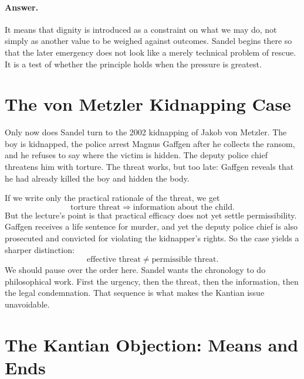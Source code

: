\paragraph{Answer.} It means that dignity is introduced as a constraint on what we may do, not simply as another value to be weighed against outcomes. Sandel begins there so that the later emergency does not look like a merely technical problem of rescue. It is a test of whether the principle holds when the pressure is greatest.

\section{The von Metzler Kidnapping Case}

Only now does Sandel turn to the 2002 kidnapping of Jakob von Metzler. The boy is kidnapped, the police arrest Magnus Gaffgen after he collects the ransom, and he refuses to say where the victim is hidden. The deputy police chief threatens him with torture. The threat works, but too late: Gaffgen reveals that he had already killed the boy and hidden the body.

If we write only the practical rationale of the threat, we get
\begin{equation}
\text{torture threat}
\Longrightarrow
\text{information about the child}.
\end{equation}
But the lecture's point is that practical efficacy does not yet settle permissibility. Gaffgen receives a life sentence for murder, and yet the deputy police chief is also prosecuted and convicted for violating the kidnapper's rights. So the case yields a sharper distinction:
\begin{equation}
\text{effective threat}
\neq
\text{permissible threat}.
\end{equation}
We should pause over the order here. Sandel wants the chronology to do philosophical work. First the urgency, then the threat, then the information, then the legal condemnation. That sequence is what makes the Kantian issue unavoidable.

\section{The Kantian Objection: Means and Ends}

